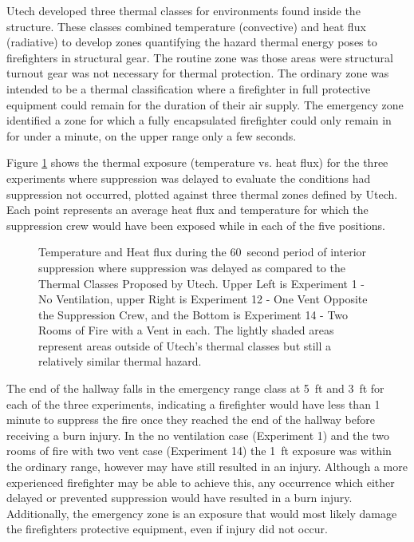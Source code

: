 \documentclass[12pt,oneside]{book}
\begin{document}
Utech developed three thermal classes for environments found inside the structure. These classes combined temperature (convective) and heat flux (radiative) to develop zones quantifying the hazard thermal energy poses to firefighters in structural gear. The routine zone was those areas were structural turnout gear was not necessary for thermal protection. The ordinary zone was intended to be a thermal classification where a firefighter in full protective equipment could remain for the duration of their air supply. The emergency zone identified a zone for which a fully encapsulated firefighter could only remain in for under a minute, on the upper range only a few seconds.  

Figure \ref{fig:Thermal_Classes_Approach_Delayed_Suppression} shows the thermal exposure (temperature vs. heat flux) for the three experiments where suppression was delayed to evaluate the conditions had suppression not occurred, plotted against three thermal zones defined by Utech. Each point represents an average heat flux and temperature for which the suppression crew would have been exposed while in each of the five positions. 

\begin{figure}[H]
\centering
\caption[Delayed Suppression Hallway Thermal Class Comparison]{Temperature and Heat flux during the 60~second period of interior suppression where suppression was delayed as compared to the Thermal Classes Proposed by Utech. Upper Left is Experiment 1 - No Ventilation, upper Right is Experiment 12 - One Vent Opposite the Suppression Crew, and the Bottom is Experiment 14 - Two Rooms of Fire with a Vent in each. The lightly shaded areas represent areas outside of Utech's thermal classes but still a relatively similar thermal hazard.}
\label{fig:Thermal_Classes_Approach_Delayed_Suppression}
\end{figure}

The end of the hallway falls in the emergency range class at 5~ft and 3~ft for each of the three experiments, indicating a firefighter would have less than 1 minute to suppress the fire once they reached the end of the hallway before receiving a burn injury. In the no ventilation case (Experiment 1) and the two rooms of fire with two vent case (Experiment 14) the 1~ft exposure was within the ordinary range, however may have still resulted in an injury. Although a more experienced firefighter may be able to achieve this, any occurrence which either delayed or prevented suppression would have resulted in a burn injury. Additionally, the emergency zone is an exposure that would most likely damage the firefighters protective equipment, even if injury did not occur. 
\end{document}

